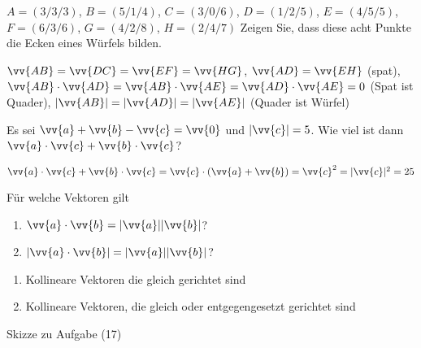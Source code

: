 \begin{exercisesKapitel}
\begin{exercise}
$A=(3/3/3)$, $B=(5/1/4)$, $C=(3/0/6)$, $D=(1/2/5)$, \newline $E=(4/5/5)$, $F=(6/3/6)$, $G=(4/2/8)$, $H=(2/4/7)$ \newline
Zeigen Sie, dass diese acht Punkte die Ecken eines Würfels bilden.
\begin{answer}
$\vv{AB}=\vv{DC} = \vv{EF} = \vv{HG}$, $\vv{AD} = \vv{EH}$ (spat), $\vv{AB} \cdot \vv{AD} = \vv{AB} \cdot \vv{AE} = \vv{AD} \cdot \vv{AE} = 0$ (Spat ist Quader), $|\vv{AB}| = |\vv{AD}| = |\vv{AE}|$ (Quader ist Würfel)
\end{answer}
\end{exercise}

\begin{exercise}
Es sei $\vv{a} + \vv{b} - \vv{c} = \vv{0}$ und $|\vv{c}|=5$. Wie viel ist dann $\vv{a} \cdot \vv{c} + \vv{b} \cdot \vv{c}$?
\begin{answer}
$\vv{a} \cdot \vv{c} + \vv{b} \cdot \vv{c} = \vv{c} \cdot (\vv{a} + \vv{b} ) = \vv{c}^{2} = |\vv{c}|^{2} = 25$
\end{answer}
\end{exercise}

\begin{exercise}
Für welche Vektoren gilt
\begin{enumerate}
\item $\vv{a} \cdot \vv{b} = |\vv{a}| |\vv{b}|$?
\item $|\vv{a} \cdot \vv{b}| = |\vv{a}| |\vv{b}|$?
\end{enumerate}
\begin{answer}
\begin{enumerate}
\item Kollineare Vektoren die gleich gerichtet sind
\item Kollineare Vektoren, die gleich oder entgegengesetzt gerichtet sind
\end{enumerate}
\end{answer}
\end{exercise}

\begin{marginfigure}[3cm]
    \caption{Skizze zu Aufgabe (17)}
\end{marginfigure}


\end{exercisesKapitel}
